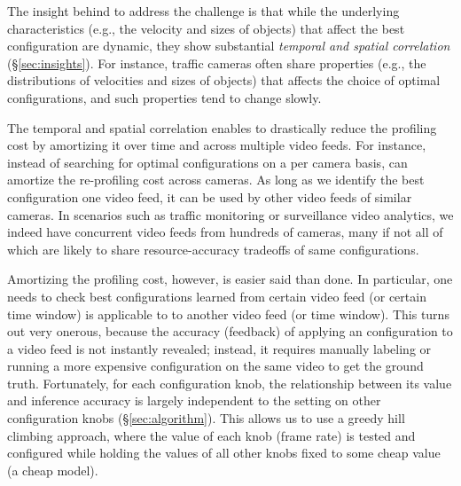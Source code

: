 {The insight behind \name to address the challenge is that while the 
underlying characteristics (e.g., the velocity and sizes of objects)
that affect the best configuration are dynamic, they show substantial
{\em temporal and spatial correlation} (\S\ref{sec:insights}).
For instance, traffic cameras often share properties (e.g.,
the distributions of velocities and sizes of objects) that affects
the choice of optimal \nn configurations, and such properties tend
to change slowly.

The temporal and spatial correlation enables \name to drastically 
reduce the profiling cost by amortizing it over time and across
multiple video feeds.
For instance, instead of searching for optimal configurations on a 
per camera basis, \name can amortize the re-profiling cost 
across cameras.
As long as we identify the best configuration one video feed, it 
can be used by other video feeds of similar cameras.
In scenarios such as traffic monitoring or surveillance video 
analytics, we indeed have concurrent video feeds from hundreds of 
cameras, many if not all of which are likely to share 
resource-accuracy tradeoffs of same configurations.

Amortizing the profiling cost, however, is easier said than done. 
In particular, one needs to check best \nn configurations learned
from certain video feed (or certain time window) is applicable to
to another video feed (or time window).
This turns out very onerous, because the accuracy (feedback) of 
applying an \nn configuration to a video feed is not instantly 
revealed; instead, it requires manually labeling or running a more
expensive configuration on the same video to get the ground truth.
Fortunately, for each configuration knob, the relationship between
its value and inference accuracy is largely independent to the setting on 
other configuration knobs (\S\ref{sec:algorithm}). This allows us to use 
a greedy hill climbing approach, where the value of each knob (\eg frame rate) is
tested and configured while holding the values of all other knobs fixed to some cheap value (\eg a cheap \nn model).



}
